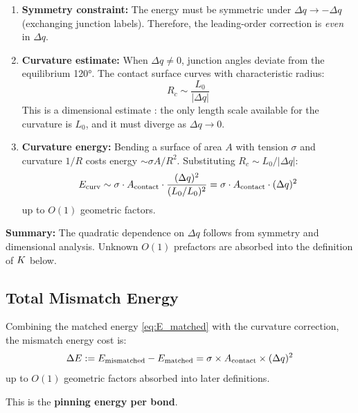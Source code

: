 \begin{enumerate}
    \item \textbf{Symmetry constraint:} The energy must be symmetric under
          $\Delta q \to -\Delta q$ (exchanging junction labels). Therefore,
          the leading-order correction is \emph{even} in $\Delta q$.

    \item \textbf{Curvature estimate:} When $\Delta q \neq 0$, junction angles
          deviate from the equilibrium 120°. The contact surface curves with
          characteristic radius:
          \begin{equation}
              R_c \sim \frac{L_0}{|\Delta q|}
              \label{eq:R_c}
          \end{equation}
          This is a dimensional estimate \tagP: the only length scale available
          for the curvature is $L_0$, and it must diverge as $\Delta q \to 0$.

    \item \textbf{Curvature energy:} Bending a surface of area $A$ with tension
          $\sigma$ and curvature $1/R$ costs energy $\sim \sigma A / R^2$.
          Substituting $R_c \sim L_0/|\Delta q|$:
          \begin{equation}
              E_{\text{curv}} \sim \sigma \cdot A_{\text{contact}} \cdot
              \frac{(\Delta q)^2}{(L_0/L_0)^2}
              = \sigma \cdot A_{\text{contact}} \cdot (\Delta q)^2
          \end{equation}
          up to $O(1)$ geometric factors. \tagP
\end{enumerate}

\textbf{Summary:} The quadratic dependence on $\Delta q$ follows from symmetry
and dimensional analysis. Unknown $O(1)$ prefactors are absorbed into the
definition of $K$ below.

\subsection{Total Mismatch Energy}

\begin{derivationbox}[title=Mismatch Energy]
    Combining the matched energy \eqref{eq:E_matched} with the curvature
    correction, the mismatch energy cost is:
    \begin{equation}
        \Delta E := E_{\text{mismatched}} - E_{\text{matched}}
                  = \sigma \times A_{\text{contact}} \times (\Delta q)^2
        \label{eq:mismatch_energy}
    \end{equation}
    up to $O(1)$ geometric factors absorbed into later definitions. \tagP

    This is the \textbf{pinning energy per bond}.
\end{derivationbox}

